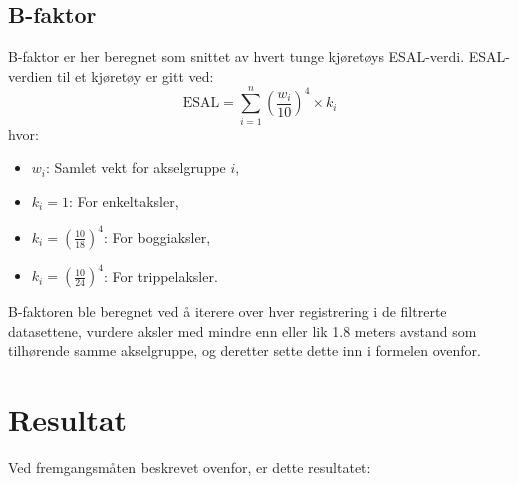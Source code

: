 \subsection{B-faktor}
B-faktor er her beregnet som snittet av hvert tunge kjøretøys ESAL-verdi. ESAL-verdien til et kjøretøy er gitt ved:
\[
\text{ESAL} = \sum_{i=1}^{n} \left(\frac{w_i}{10}\right)^4 \times k_i
\]
hvor:
\begin{itemize}
    \item \(w_i\): Samlet vekt for akselgruppe \(i\),
    \item \(k_i = 1\): For enkeltaksler,
    \item \(k_i = \left(\frac{10}{18}\right)^4\): For boggiaksler,
    \item \(k_i = \left(\frac{10}{24}\right)^4\): For trippelaksler.
\end{itemize}
B-faktoren ble beregnet ved å iterere over hver registrering i de filtrerte datasettene, vurdere aksler med mindre enn eller lik 1.8 meters avstand som tilhørende samme akselgruppe, og deretter sette dette inn i formelen ovenfor.

\section{Resultat}
Ved fremgangsmåten beskrevet ovenfor, er dette resultatet:
